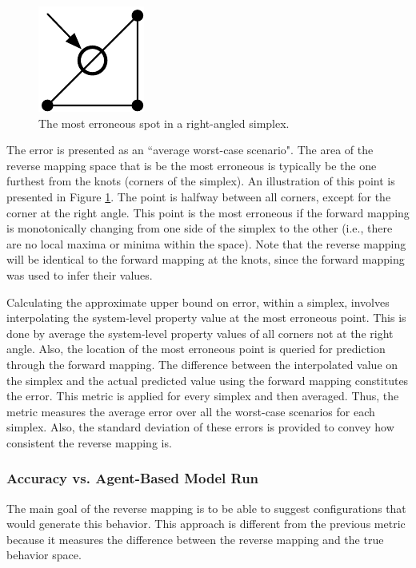 \begin{figure}[ht]
\centering
\includegraphics[scale=1]{images/mosterror.pdf}
\caption{The most erroneous spot in a right-angled simplex.}
\label{fig:mosterror}
\end{figure}

The error is presented as an ``average worst-case scenario".
The area of the reverse mapping space that is be the most erroneous is typically be the one furthest from the knots (corners of the simplex).
An illustration of this point is presented in Figure \ref{fig:mosterror}.
The point is halfway between all corners, except for the corner at the right angle.
This point is the most erroneous if the forward mapping is monotonically changing from one side of the simplex to the other (i.e., there are no local maxima or minima within the space).
Note that the reverse mapping will be identical to the forward mapping at the knots, since the forward mapping was used to infer their values.

Calculating the approximate upper bound on error, within a simplex, involves interpolating the system-level property value at the most erroneous point.
This is done by average the system-level property values of all corners not at the right angle.
Also, the location of the most erroneous point is queried for prediction through the forward mapping.
The difference between the interpolated value on the simplex and the actual predicted value using the forward mapping constitutes the error.
This metric is applied for every simplex and then averaged.
Thus, the metric measures the average error over all the worst-case scenarios for each simplex.
Also, the standard deviation of these errors is provided to convey how consistent the reverse mapping is.


  \subsubsection{Accuracy vs. Agent-Based Model Run}

The main goal of the reverse mapping is to be able to suggest configurations that would generate this behavior.
This approach is different from the previous metric because it measures the difference between the reverse mapping and the true behavior space.

